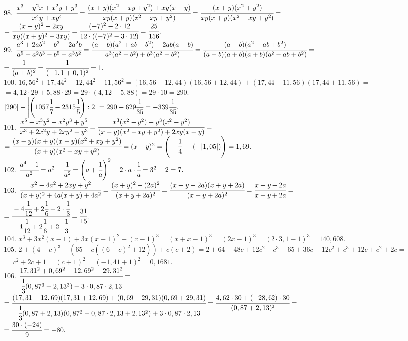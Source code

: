 \documentclass[12pt]{article}
\begin{document}
98. $\cfrac{x^3+y^2x+x^2y+y^3}{x^4y+xy^4}=\cfrac{(x+y)(x^2-xy+y^2)+xy(x+y)}{xy(x+y)(x^2-xy+y^2)}=
\cfrac{(x+y)(x^2+y^2)}{xy(x+y)(x^2-xy+y^2)}=$\\$=\cfrac{(x+y)^2-2xy}{xy((x+y)^2-3xy)}=\cfrac{(-7)^2-2\cdot12}{12\cdot((-7)^2-3\cdot12)}=\cfrac{25}{156}.$\\
99. $\cfrac{a^3+2ab^2-b^3-2a^2b}{a^5+a^2b^3-b^5-a^3b^2}=\cfrac{(a-b)(a^2+ab+b^2)-2ab(a-b)}{a^3(a^2-b^2)+b^3(a^2-b^2)}=
\cfrac{(a-b)(a^2-ab+b^2)}{(a-b)(a+b)(a+b)(a^2-ab+b^2)}=$\\$=\cfrac{1}{(a+b)^2}=\cfrac{1}{(-1,1+0,1)^2}=1.$\\
100. $16,56^2+17,44^2-12,44^2-11,56^2=(16,56-12,44)(16,56+12,44)+(17,44-11,56)(17,44+11,56)=$\\$=4,12\cdot29+5,88\cdot29=29\cdot(4,12+5,88)=29\cdot10=290.$\\
$|290|-\left |\left(1057\cfrac{1}{7}-2315\cfrac{1}{5}\right):2\right |=290-629\cfrac{1}{35}=-339\cfrac{1}{35}.$\\
101. $\cfrac{x^5-x^3y^2-x^2y^3+y^5}{x^3+2x^2y+2xy^2+y^3}=\cfrac{x^3(x^2-y^2)-y^3(x^2-y^2)}{(x+y)(x^2-xy+y^2)+2xy(x+y)}=$\\$=
\cfrac{(x-y)(x+y)(x-y)(x^2+xy+y^2)}{(x+y)(x^2+xy+y^2)}=(x-y)^2=\left(\left|-\cfrac{1}{4}\right|-(-|1,05|)\right)=1,69.$\\
102. $\cfrac{a^4+1}{a^2}=a^2+\cfrac{1}{a^2}=\left(a+\cfrac{1}{a}\right)^2-2\cdot a\cdot\cfrac{1}{a}=3^2-2=7.$\\
103. $\cfrac{x^2-4a^2+2xy+y^2}{(x+y)^2+4a(x+y)+4a^2}=\cfrac{(x+y)^2-(2a)^2}{(x+y+2a)^2}=\cfrac{(x+y-2a)(x+y+2a)}{(x+y+2a)^2}=\cfrac{x+y-2a}{x+y+2a}=$\\$=
\cfrac{-4\cfrac{1}{12}+2\cfrac{1}{6}-2\cdot\cfrac{1}{3}}{-4\cfrac{1}{12}+2\cfrac{1}{6}+2\cdot\cfrac{1}{3}}=\cfrac{31}{15}.$\\
104. $x^3+3x^2(x-1)+3x(x-1)^2+(x-1)^3=(x+x-1)^3=(2x-1)^3=(2\cdot3,1-1)^3=140,608.$\\
105. $2+(4-c)^3-(65-c((6-c)^2+12))+c(c+2)=2+64-48c+12c^2-c^3-65+36c-12c^2+c^3+12c+c^2+2c=$\\$=c^2+2c+1=(c+1)^2=(-1,41+1)^2=0,1681.$\\
106. $\cfrac{17,31^2+0,69^2-12,69^2-29,31^2}{\cfrac{1}{3}(0,87^3+2,13^3)+3\cdot0,87\cdot2,13}=$\\$=\cfrac{(17,31-12,69)(17,31+12,69)+(0,69-29,31)(0,69+29,31)}{\cfrac{1}{3}(0,87+2,13)(0,87^2-0,87\cdot2,13+2,13^2)+3\cdot0,87\cdot2,13}=
\cfrac{4,62\cdot30+(-28,62)\cdot30}{(0,87+2,13)^2}=$\\$=\cfrac{30\cdot(-24)}{9}=-80.$\\
\end{document}
